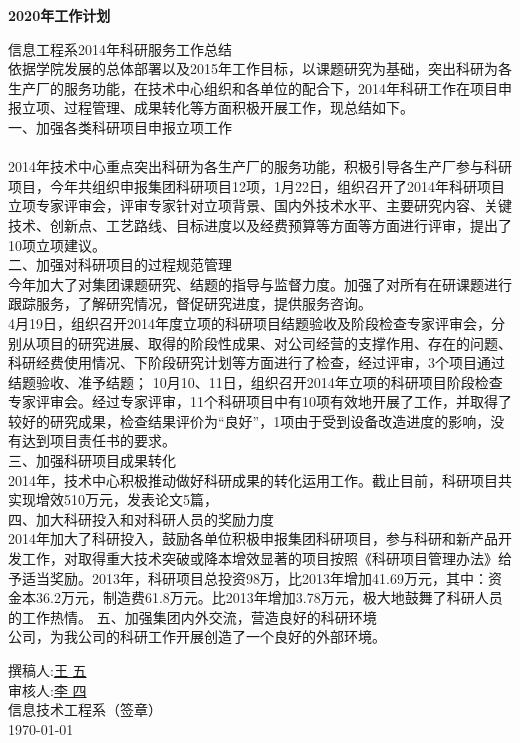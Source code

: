 \documentclass[a4paper,12pt]{article}%
\begin{document}
 

\begin{center}
  {\large \bfseries   2020年工作计划}
\end{center}

\large{  { 信息工程系2014年科研服务工作总结\\}}
依据学院发展的总体部署以及2015年工作目标，以课题研究为基础，突出科研为各生产厂的服务功能，在技术中心组织和各单位的配合下，2014年科研工作在项目申报立项、过程管理、成果转化等方面积极开展工作，现总结如下。\\
一、加强各类科研项目申报立项工作\\
\\2014年技术中心重点突出科研为各生产厂的服务功能，积极引导各生产厂参与科研项目，今年共组织申报集团科研项目12项，1月22日，组织召开了2014年科研项目立项专家评审会，评审专家针对立项背景、国内外技术水平、主要研究内容、关键技术、创新点、工艺路线、目标进度以及经费预算等方面等方面进行评审，提出了10项立项建议。\\
二、加强对科研项目的过程规范管理\\
今年加大了对集团课题研究、结题的指导与监督力度。加强了对所有在研课题进行跟踪服务，了解研究情况，督促研究进度，提供服务咨询。\\
4月19日，组织召开2014年度立项的科研项目结题验收及阶段检查专家评审会，分别从项目的研究进展、取得的阶段性成果、对公司经营的支撑作用、存在的问题、科研经费使用情况、下阶段研究计划等方面进行了检查，经过评审，3个项目通过结题验收、准予结题；
10月10、11日，组织召开2014年立项的科研项目阶段检查专家评审会。经过专家评审，11个科研项目中有10项有效地开展了工作，并取得了较好的研究成果，检查结果评价为“良好”，1项由于受到设备改造进度的影响，没有达到项目责任书的要求。\\
三、加强科研项目成果转化\\
2014年，技术中心积极推动做好科研成果的转化运用工作。截止目前，科研项目共实现增效510万元，发表论文5篇，\\
四、加大科研投入和对科研人员的奖励力度\\
2014年加大了科研投入，鼓励各单位积极申报集团科研项目，参与科研和新产品开发工作，对取得重大技术突破或降本增效显著的项目按照《科研项目管理办法》给予适当奖励。2013年，科研项目总投资98万，比2013年增加41.69万元，其中：资金本36.2万元，制造费61.8万元。比2013年增加3.78万元，极大地鼓舞了科研人员的工作热情。
五、加强集团内外交流，营造良好的科研环境\\
公司，为我公司的科研工作开展创造了一个良好的外部环境。\\


\null
\vfill  %
\begin{minipage}{0.94\textwidth}  
  \begin{flushright}   %
    {\Large 撰稿人:\underline{王 五\hspace{3cm}}} \\[10pt]
    {\Large 审核人:\underline{李 四\hspace{3cm}}} \\[0.5cm]
    {\large \color{blue} 信息技术工程系（签章）} \\[0.5cm]
    {\large \today}
    
  \end{flushright}
\end{minipage}
\end{document}
